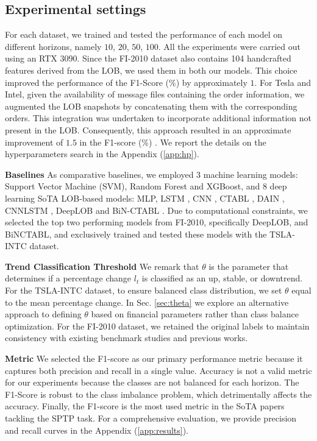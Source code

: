 \subsection{Experimental settings}
For each dataset, we trained and tested the performance of each model on different horizons, namely $10$, $20$, $50$, $100$. 
All the experiments were carried out using an RTX 3090.
Since the FI-2010 dataset also contains 104 handcrafted features derived from the LOB, we used them in both our models. This choice improved the performance of the F1-Score (\%)  by approximately $1$.
For Tesla and Intel, given the availability of message files containing the order information, we augmented the LOB snapshots by concatenating them with the corresponding orders. This integration was undertaken to incorporate additional information not present in the LOB. Consequently, this approach resulted in an approximate improvement of $1.5$ in the F1-score (\%) . We report the details on the hyperparameters search in the Appendix (\ref{app:hp}).

\textbf{Baselines} As comparative baselines, we employed 3 machine learning models: Support Vector Machine (SVM), Random Forest and XGBoost, and 8 deep learning SoTA LOB-based models: MLP, LSTM \cite{tsantekidis2017forecasting}, CNN \cite{tsantekidis2017using}, CTABL \cite{tran2018temporal}, DAIN \cite{passalis2019deep}, CNNLSTM \cite{tsantekidis2020using}, DeepLOB \cite{zhang2019deeplob} and BiN-CTABL \cite{tran2021data}. Due to computational constraints, we selected the top two performing models from FI-2010, specifically DeepLOB, and BiNCTABL, and exclusively trained and tested these models with the TSLA-INTC dataset. 

\textbf{Trend Classification Threshold} We remark that $\theta$ is the parameter that determines if a percentage change $l_t$ is classified as an up, stable, or downtrend. For the TSLA-INTC dataset, to ensure balanced class distribution, we set $\theta$ equal to the mean percentage change. In Sec. \ref{sec:theta} we explore an alternative approach to defining $\theta$ based on financial parameters rather than class balance optimization. For the FI-2010 dataset, we retained the original labels to maintain consistency with existing benchmark studies and previous works.

\textbf{Metric} We selected the F1-score as our primary performance metric because it captures both precision and recall in a single value. Accuracy is not a valid metric for our experiments because the classes are not balanced for each horizon. The F1-Score is robust to the class imbalance problem, which detrimentally affects the accuracy. Finally, the F1-score is the most used metric in the SoTA papers tackling the SPTP task. For a comprehensive evaluation, we provide precision and recall curves in the Appendix (\ref{app:results}).
